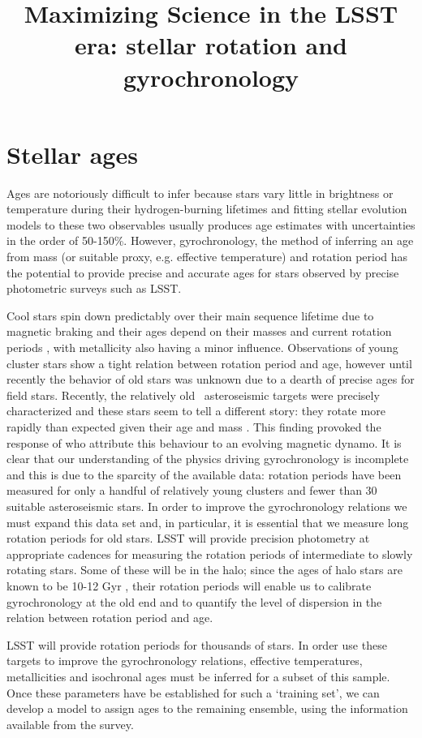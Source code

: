 \documentclass[letterpaper,11pt,preprint]{hack_aastex}
\begin{document}
\title{Maximizing Science in the LSST era: stellar rotation and
gyrochronology}

\section*{Stellar ages}
Ages are notoriously difficult to infer because stars vary little in brightness
or temperature during their hydrogen-burning lifetimes and fitting stellar
evolution models to these two observables usually produces age estimates with
uncertainties in the order of 50-150\%.
However, gyrochronology, the method of inferring an age from mass (or
suitable proxy, e.g. effective temperature) and rotation period has the
potential to provide precise and accurate ages for stars observed by precise
photometric surveys such as LSST.

Cool stars spin down predictably over their main sequence lifetime due
to magnetic braking and their ages depend on their masses and current rotation
periods \citep[e.g.][]{skumanich, kawaler, barnes}, with metallicity also
having a minor influence.
Observations of young cluster stars show a tight relation between rotation
period and age, \citep{meibom} however until recently the behavior of old
stars was unknown due to a dearth of precise ages for field stars.
Recently, the relatively old \Kepler\ asteroseismic targets were precisely
characterized and these stars seem to tell a different story: they
rotate more rapidly than expected given their age and mass \citep{angus}.
This finding provoked the response of \citet{vansaders} who attribute this
behaviour to an evolving magnetic dynamo.
It is clear that our understanding of the physics driving gyrochronology is
incomplete and this is due to the sparcity of the available data: rotation
periods have been measured for only a handful of relatively young clusters
and fewer than 30 suitable asteroseismic stars.
In order to improve the gyrochronology relations we must expand this data set
and, in particular, it is essential that we measure long rotation periods for
old stars.
LSST will provide precision photometry at appropriate cadences for
measuring the rotation periods of intermediate to slowly rotating stars.
Some of these will be in the halo; since the ages of halo stars are known
to be 10-12 Gyr \citep[e.g.][]{jofre}, their rotation periods will enable us
to calibrate gyrochronology at the old end and to quantify the level of
dispersion in the relation between rotation period and age.

LSST will provide rotation periods for thousands of stars.
In order use these targets to improve the gyrochronology relations, effective
temperatures, metallicities and isochronal ages must be inferred for a subset
of this sample.
Once these parameters have be established for such a `training set', we can
develop a model to assign ages to the remaining ensemble, using the
information available from the survey.
\end{document}
